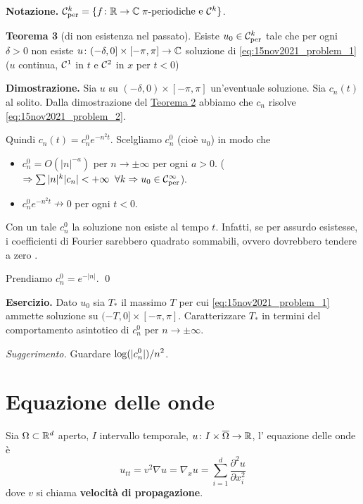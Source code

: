 %
%

\textbf{Notazione.} $\mathcal{C}_{\operatorname{per}}^k = \{ f\colon  \mathbb R \to \mathbb C \; \pi\text{-periodiche e } \mathcal{C}^k \} $.

\textbf{Teorema 3} (di non esistenza nel passato).
Esiste $u_0 \in \mathcal{C}_{\operatorname{per}}^k$ tale che per ogni $\delta > 0$ non esiste $u \colon (-\delta,0] \times [-\pi,\pi] \to \mathbb C$ soluzione di \eqref{eq:15nov2021_problem_1} ($u$ continua, $\mathcal{C}^1$ in $t$ e $\mathcal{C}^2$ in $x$ per $t < 0$)

\textbf{Dimostrazione.} Sia $u$ su $(-\delta,0) \times [-\pi,\pi]$ un'eventuale soluzione.
Sia $c_n(t)$ al solito.
Dalla dimostrazione del \hyperlink{thm:lez15nov_teo2}{Teorema 2} abbiamo che $c_n$ risolve \eqref{eq:15nov2021_problem_2}.

Quindi $c_n(t) = c_n^0 e^{-n^2 t}$. Scelgliamo $c_n^0$ (cioè $u_0$) in modo che

\begin{itemize}

	\item $c_n^0 = O(|n|^{-a})$ per $n \to \pm \infty$ per ogni $a > 0$. ($\Rightarrow \sum |n|^k |c_n| < +\infty \;\; \forall k \Rightarrow u_0 \in \mathcal{C}_{\operatorname{per}}^\infty$).


	\item $c_n^0 e^{-n^2 t} \nrightarrow 0$ per ogni $t < 0$.

\end{itemize}

Con un tale $c_n^0$ la soluzione non esiste al tempo $t$. Infatti, se per assurdo esistesse, i coefficienti di Fourier sarebbero quadrato sommabili, ovvero dovrebbero tendere a zero \absurd.

Prendiamo $c_n^0 = e^{-|n|}$.
\qed

\textbf{Esercizio.} Dato $u_0$ sia $T_\ast $ il massimo $T$ per cui \eqref{eq:15nov2021_problem_1} ammette soluzione su $(-T,0] \times [-\pi,\pi]$.
Caratterizzare $T_\ast$ in termini del comportamento asintotico di $c_n^0$ per $n \to \pm \infty$.

\textit{Suggerimento.} Guardare $\displaystyle \log(|c_n^0|) / n^2$.


\section{Equazione delle onde}

Sia $\Omega \subset \mathbb R^d$ aperto, $I$ intervallo temporale, $u \colon I \times \overline{\Omega} \to \mathbb R$, l' equazione delle onde è
%
$$
	u_{tt} = v^2 \nabla u = \nabla_x u = \sum_{i=1}^{d} \frac{\partial^2 u}{\partial x_i^2}
$$
%
dove $v$ si chiama \textbf{velocità di propagazione}.

